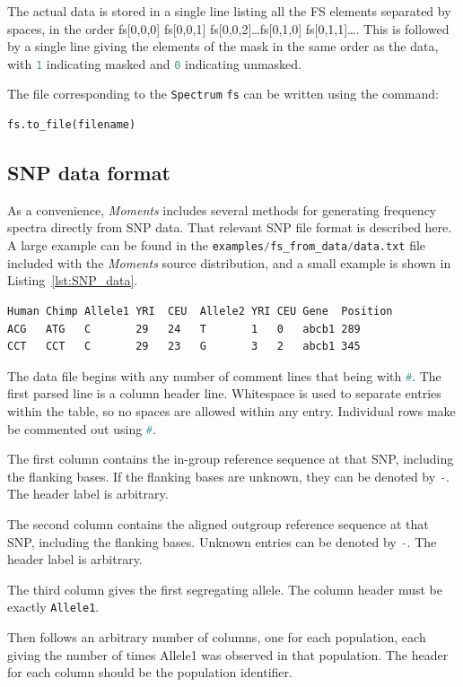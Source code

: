 \documentclass[12pt]{article}
\makeatletter
\newcommand{\py}[1]{\lstinline[language=Python, showstringspaces=False]@#1@}
\makeatother
\begin{document}
The actual data is stored in a single line listing all the FS elements separated by spaces, in the order fs[0,0,0] fs[0,0,1] fs[0,0,2]\dots fs[0,1,0] fs[0,1,1]\dots.
This is followed by a single line giving the elements of the mask in the same order as the data, with \py{1} indicating masked and \py{0} indicating unmasked.

The file corresponding to the \py{Spectrum} \py{fs} can be written using the command:
\begin{lstlisting}
fs.to_file(filename)
\end{lstlisting}

\subsection{SNP data format}

As a convenience, \textit{Moments} includes several methods for generating frequency spectra directly from SNP data.
That relevant SNP file format is described here.
A large example can be found in the \py{examples/fs_from_data/data.txt} file included with the \textit{Moments} source distribution, and a small example is shown in Listing~\ref{lst:SNP_data}.

\begin{lstlisting}[caption={Example of SNP file format}, float, label={lst:SNP_data}]
Human Chimp Allele1 YRI  CEU  Allele2 YRI CEU Gene  Position
ACG   ATG   C       29   24   T       1   0   abcb1 289
CCT   CCT   C       29   23   G       3   2   abcb1 345
\end{lstlisting}

The data file begins with any number of comment lines that being with \py{#}.
The first parsed line is a column header line.
Whitespace is used to separate entries within the table, so no spaces are allowed within any entry.
Individual rows make be commented out using \py{#}.

The first column contains the in-group reference sequence at that SNP, including the flanking bases.
If the flanking bases are unknown, they can be denoted by \py{-}.
The header label is arbitrary.

The second column contains the aligned outgroup reference sequence at that SNP, including the flanking bases.
Unknown entries can be denoted by \py{-}.
The header label is arbitrary.

The third column gives the first segregating allele.
The column header must be exactly \py{Allele1}.

Then follows an arbitrary number of columns, one for each population, each giving the number of times Allele1 was observed in that population.
The header for each column should be the population identifier.
\end{document}
